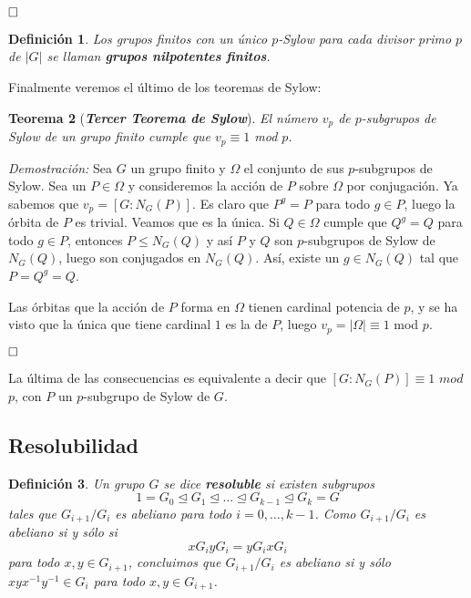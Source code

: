 \documentclass[12pt]{article}
\newtheorem{theorem}{Teorema}[section]
\newtheorem{definition}[theorem]{Definición}
\begin{document}
$\hfill \square$

\begin{definition}Los grupos finitos con un único $p$-Sylow para cada divisor primo $p$ de $|G|$ se llaman \textbf{grupos nilpotentes finitos}.
\end{definition}

Finalmente veremos el último de los teoremas de Sylow:

\begin{theorem}[\textit{\textbf{Tercer Teorema de Sylow}}]
El número $v_{p}$ de $p$-subgrupos de Sylow de un grupo finito cumple que $v_{p} \equiv 1$ mod $p$.
\end{theorem}
\emph{Demostración: }Sea $G$ un grupo finito y $\Omega$ el conjunto de sus $p$-subgrupos de Sylow. Sea un $P \in \Omega$ y consideremos la acción de $P$ sobre $\Omega$ por conjugación. Ya sabemos que $v_p = [G:N_G(P)]$. Es claro que $P^{g}=P$ para todo $g \in P$, luego la órbita de $P$ es trivial. Veamos que es la única. Si $Q \in \Omega$ cumple que $Q^{g} = Q$ para todo $g \in P$, entonces $P \leq N_{G}(Q)$ y así $P$ y $Q$ son $p$-subgrupos de Sylow de $N_{G}(Q)$, luego son conjugados en $N_{G}(Q)$. Así, existe un $g \in N_{G}(Q)$ tal que $P = Q^{g}= Q$.

Las órbitas que la acción de $P$ forma en $\Omega$ tienen cardinal potencia de $p$, y se ha visto que la única que tiene cardinal $1$ es la de $P$, luego $v_{p}=|\Omega| \equiv 1$ mod $p$.

$\hfill \square$

La última de las consecuencias es equivalente a decir que $\left[ G:N_{G}(P) \right] \equiv 1$ $mod$ $p$, con $P$ un $p$-subgrupo de Sylow de $G$.

\subsection{Resolubilidad}

\begin{definition}Un grupo $G$ se dice \textbf{resoluble} si existen subgrupos $$1 = G_0 \unlhd G_1 \unlhd \ldots \unlhd G_{k-1} \unlhd G_{k} = G$$ tales que $G_{i+1}/G_i$ es abeliano para todo $i= 0, \ldots, k-1$. Como $G_{i+1}/G_i$ es abeliano si y sólo si $$xG_iyG_i = yG_ixG_i$$ para todo $x,y \in G_{i+1}$, concluimos que $G_{i+1}/G_i$ es abeliano si y sólo $xyx^{-1}y^{-1} \in G_i$ para todo $x,y \in G_{i+1}$.
\end{definition}
\end{document}
